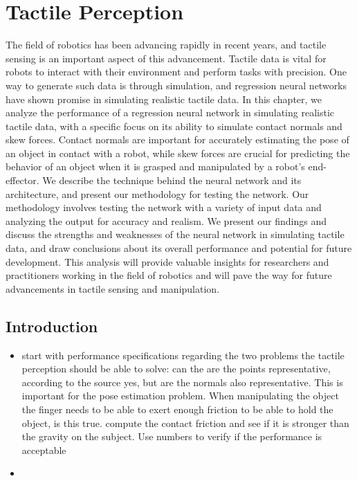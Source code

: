 \chapter{Tactile Perception} \label{ch:1-tactile-perception}

The field of robotics has been advancing rapidly in recent years, and tactile sensing is an important aspect of this advancement. Tactile data is vital for robots to interact with their environment and perform tasks with precision. One way to generate such data is through simulation, and regression neural networks have shown promise in simulating realistic tactile data. In this chapter, we analyze the performance of a regression neural network in simulating realistic tactile data, with a specific focus on its ability to simulate contact normals and skew forces. Contact normals are important for accurately estimating the pose of an object in contact with a robot, while skew forces are crucial for predicting the behavior of an object when it is grasped and manipulated by a robot's end-effector. We describe the technique behind the neural network and its architecture, and present our methodology for testing the network. Our methodology involves testing the network with a variety of input data and analyzing the output for accuracy and realism. We present our findings and discuss the strengths and weaknesses of the neural network in simulating tactile data, and draw conclusions about its overall performance and potential for future development. This analysis will provide valuable insights for researchers and practitioners working in the field of robotics and will pave the way for future advancements in tactile sensing and manipulation.

\section{Introduction} \label{sec:1-tactile-perception-introduction}

\begin{itemize}
	\item start with performance specifications regarding the two problems the tactile perception should be able to solve: can the are the points representative, according to the source yes, but are the normals also representative. This is important for the pose estimation problem. When manipulating the object the finger needs to be able to exert enough friction to be able to hold the object, is this true. compute the contact friction and see if it is stronger than the gravity on the subject. Use numbers to verify if the performance is acceptable
	\item 
\end{itemize}


